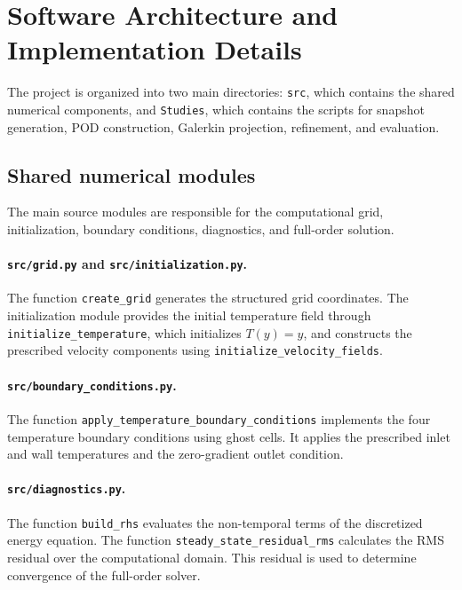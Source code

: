 \section{Software Architecture and Implementation Details}
\label{app:software_architecture}

The project is organized into two main directories:
\texttt{src}, which contains the shared numerical
components, and \texttt{Studies}, which contains the
scripts for snapshot generation, POD construction,
Galerkin projection, refinement, and evaluation.

\subsection{Shared numerical modules}

The main source modules are responsible for the
computational grid, initialization, boundary conditions,
diagnostics, and full-order solution.

\paragraph{\texttt{src/grid.py} and
\texttt{src/initialization.py}.}

The function \texttt{create\_grid} generates the
structured grid coordinates. The initialization
module provides the initial temperature field through
\texttt{initialize\_temperature}, which initializes
$T(y)=y$, and constructs the prescribed velocity
components using \texttt{initialize\_velocity\_fields}.

\paragraph{\texttt{src/boundary\_conditions.py}.}

The function \texttt{apply\_temperature\_boundary\_conditions}
implements the four temperature boundary conditions
using ghost cells. It applies the prescribed inlet
and wall temperatures and the zero-gradient outlet
condition.

\paragraph{\texttt{src/diagnostics.py}.}

The function \texttt{build\_rhs} evaluates the
non-temporal terms of the discretized energy equation.
The function \texttt{steady\_state\_residual\_rms}
calculates the RMS residual over the computational
domain. This residual is used to determine convergence
of the full-order solver.


